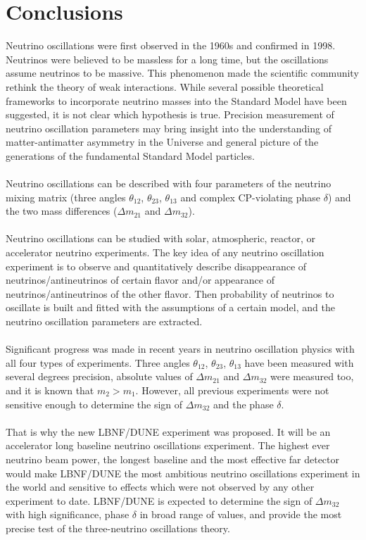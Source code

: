 \section{Conclusions}
Neutrino oscillations were first observed in the 1960s and confirmed in 1998. Neutrinos were believed to be massless for a long time, but the oscillations assume neutrinos to be massive. This phenomenon made the scientific community rethink the theory of weak interactions. While several possible theoretical frameworks to incorporate neutrino masses into the Standard Model have been suggested, it is not clear which hypothesis is true. Precision measurement of neutrino oscillation parameters may bring insight into the understanding of matter-antimatter asymmetry in the Universe and general picture of the generations of the fundamental Standard Model particles. \\ \\
Neutrino oscillations can be described with four parameters of the neutrino mixing matrix (three angles $\theta_{12}$, $\theta_{23}$, $\theta_{13}$ and complex CP-violating phase $\delta$) and the two mass differences (${\Delta}m_{21}$ and ${\Delta}m_{32}$).\\ \\
Neutrino oscillations can be studied with solar, atmospheric, reactor, or accelerator neutrino experiments. The key idea of any neutrino oscillation experiment is to observe and quantitatively describe disappearance of neutrinos/antineutrinos of certain flavor and/or appearance of neutrinos/antineutrinos of the other flavor. Then probability of neutrinos to oscillate is built and fitted with the assumptions of a certain model, and the neutrino oscillation parameters are extracted.\\ \\
Significant progress was made in recent years in neutrino oscillation physics with all four types of experiments. Three angles $\theta_{12}$, $\theta_{23}$, $\theta_{13}$ have been measured with several degrees precision, absolute values of ${\Delta}m_{21}$ and ${\Delta}m_{32}$ were measured too, and it is known that $m_2 > m_1$. However, all previous experiments were not sensitive enough to determine the sign of ${\Delta}m_{32}$ and the phase $\delta$.\\ \\
That is why the new LBNF/DUNE experiment was proposed. It will be an accelerator long baseline neutrino oscillations experiment. The highest ever neutrino beam power, the longest baseline and the most effective far detector would make LBNF/DUNE the most ambitious neutrino oscillations experiment in the world and sensitive to effects which were not observed by any other experiment to date. LBNF/DUNE is expected to determine the sign of ${\Delta}m_{32}$ with high significance, phase $\delta$ in broad range of values, and provide the most precise test of the three-neutrino oscillations theory.\\ \\
